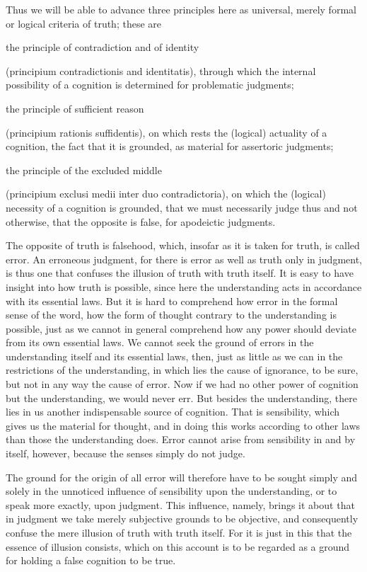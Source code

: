 Thus we will be able to advance three principles here as universal,
merely formal or logical criteria of truth; these are

the principle of contradiction and of identity

(principium contradictionis and identitatis),
through which the internal possibility of a cognition is determined for problematic judgments;

the principle of sufficient reason

(principium rationis suffidentis),
on which rests the (logical) actuality of a cognition,
the fact that it is grounded, as material for assertoric judgments;

the principle of the excluded middle

(principium exclusi medii inter duo contradictoria),
on which the (logical) necessity of a cognition is grounded,
that we must necessarily judge thus and not otherwise,
that the opposite is false, for apodeictic judgments.

The opposite of truth is falsehood, which,
insofar as it is taken for truth, is called error.
An erroneous judgment, for there is error as well as truth only in judgment,
is thus one that confuses the illusion of truth with truth itself.
It is easy to have insight into how truth is possible,
since here the understanding acts in accordance with its essential laws.
But it is hard to comprehend how error in the formal sense of the word,
how the form of thought contrary to the understanding is possible,
just as we cannot in general comprehend how any power
should deviate from its own essential laws.
We cannot seek the ground of errors in
the understanding itself and its essential laws, then,
just as little as we can in the restrictions of the understanding,
in which lies the cause of ignorance, to be sure,
but not in any way the cause of error.
Now if we had no other power of cognition
but the understanding, we would never err.
But besides the understanding, there lies in us
another indispensable source of cognition.
That is sensibility, which gives us the material for thought, and
in doing this works according to other laws than those the understanding does.
Error cannot arise from sensibility in and by itself, however,
because the senses simply do not judge.

The ground for the origin of all error will therefore have to be sought
simply and solely in the unnoticed influence of sensibility upon
the understanding, or to speak more exactly, upon judgment.
This influence, namely, brings it about that in judgment
we take merely subjective grounds to be objective, and
consequently confuse the mere illusion of truth with truth itself.
For it is just in this that the essence of illusion consists,
which on this account is to be regarded as a ground
for holding a false cognition to be true.

